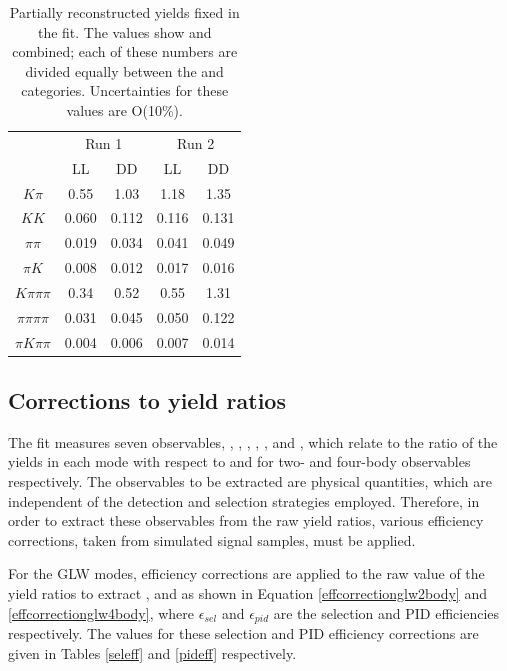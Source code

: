 \begin{table}[h]
\centering
\begin{tabular}{c|cc|cc}
\hline
& \multicolumn{2}{c}{Run 1} & \multicolumn{2}{c}{Run 2} \\
& LL & DD & LL & DD \\
\hline
$K\pi$ & 0.55 & 1.03 & 1.18 & 1.35 \\
$KK$ & 0.060 & 0.112 & 0.116 & 0.131 \\
$\pi\pi$ & 0.019 & 0.034 & 0.041 & 0.049 \\
$\pi K$ & 0.008 & 0.012 & 0.017 & 0.016 \\
$K\pi\pi\pi$ & 0.34 & 0.52 & 0.55 & 1.31 \\
$\pi\pi\pi\pi$ & 0.031 & 0.045 & 0.050 & 0.122  \\
$\pi K\pi\pi$ & 0.004 & 0.006 & 0.007 & 0.014 \\
\hline
\end{tabular}
\caption{Partially reconstructed yields fixed in the \CP fit. The values show \Bp and \Bm combined; each of these numbers are divided equally between the \Bp and \Bm categories. Uncertainties for these values are O(10\%).}
\label{partrecofixedyields}
\end{table}

\subsection{Corrections to yield ratios}
\label{sec:cpfit:efficiencies}

The \CP fit measures seven observables, \Rkk, \Rpipi, \Rptwo, \Rmtwo, \Rpipipipi, \Rpfour and \Rmfour, which relate to the ratio of the yields in each \Dz mode with respect to \decay{\Bm}{\D(\Km\pip)\Kstarm} and \decay{\Bm}{\D(\Km\pip\pim\pip)\Kstarm} for two- and four-body observables respectively. The \CP observables to be extracted are physical quantities, which are independent of the detection and selection strategies employed. Therefore, in order to extract these \CP observables from the raw yield ratios, various efficiency corrections, taken from simulated signal samples, must be applied.

For the GLW modes, efficiency corrections are applied to the raw value of the yield ratios to extract \Rkk, \Rpipi and \Rpipipipi as shown in Equation \ref{effcorrectionglw2body} and \ref{effcorrectionglw4body}, where $\epsilon_{sel}$ and $\epsilon_{pid}$ are the selection and PID efficiencies respectively. The values for these selection and PID efficiency corrections are given in Tables \ref{seleff} and \ref{pideff} respectively.

